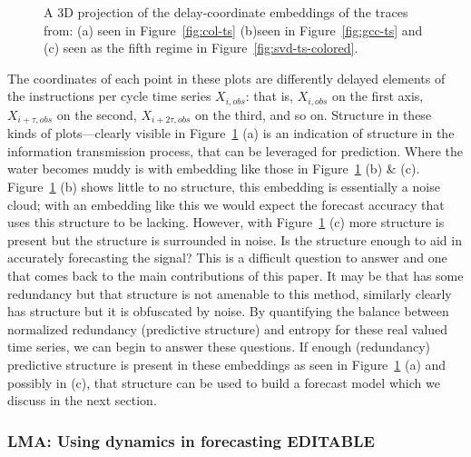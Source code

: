 \begin{figure}
   
     \caption{A 3D projection of the delay-coordinate embeddings of the traces
 from: (a) \col seen in Figure~\ref{fig:col-ts} (b)\gcc seen in Figure~\ref{fig:gcc-ts} and (c) \svdfive seen as the fifth regime in Figure~\ref{fig:svd-ts-colored}.
 }
 \label{fig:embedding}
 \end{figure}



The coordinates of each point in these plots are differently delayed
elements of the instructions per cycle time series
$X_{i,obs}$: that is, $X_{i,obs}$ on the first axis, $X_{i+\tau,obs}$ on the second,
$X_{i+2\tau,obs}$ on the third, and so on.
Structure in these kinds of plots---clearly visible in
Figure~\ref{fig:embedding} (a) is an indication of
structure in the information transmission process, that can be leveraged for prediction. Where the water becomes muddy is with embedding like those in Figure~\ref{fig:embedding} (b) \& (c). Figure~\ref{fig:embedding} (b) shows little to no structure, this embedding is essentially a noise cloud; with an embedding like this we would expect the forecast accuracy that uses this structure to be lacking. However, with Figure~\ref{fig:embedding} (c) more structure is present but the structure is surrounded in noise. Is the structure enough to aid in accurately forecasting the signal? This is a difficult question to answer and one that comes back to the main contributions of this paper. It may be that \gcc has some redundancy but that structure is not amenable to this method, similarly \svdfive clearly has structure but it is obfuscated by noise. By quantifying the balance between normalized redundancy (predictive structure) and entropy for these real valued time series, we can begin to answer these questions.  If enough (redundancy) predictive structure is present in these embeddings as seen in Figure~\ref{fig:embedding} (a) and possibly in (c), that structure can be used to build a forecast model which we discuss in the next section.
 \subsubsection{LMA: Using dynamics in forecasting {\color{blue} EDITABLE}}

